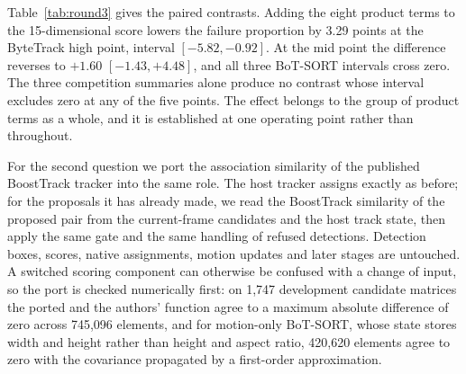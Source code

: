 Table~\ref{tab:round3} gives the paired contrasts. Adding the eight product
terms to the 15-dimensional score lowers the failure proportion by 3.29
points at the ByteTrack high point, interval $[-5.82,-0.92]$. At the mid
point the difference reverses to $+1.60$ $[-1.43,+4.48]$, and all three
BoT-SORT intervals cross zero. The three competition summaries alone
produce no contrast whose interval excludes zero at any of the five
points. The effect belongs to the group of product terms as a whole, and
it is established at one operating point rather than throughout.

For the second question we port the association similarity of the published
BoostTrack tracker \cite{stanjoevic2024boosttrack} into the same role. The
host tracker assigns exactly as
before; for the proposals it has already made, we read the BoostTrack
similarity of the proposed pair from the current-frame candidates and the
host track state, then apply the same gate and the same handling of
refused detections. Detection boxes, scores, native assignments, motion
updates and later stages are untouched. A switched scoring component can
otherwise be confused with a change of input, so the port is checked
numerically first: on 1,747 development candidate matrices the ported and
the authors' function agree to a maximum absolute difference of zero
across 745,096 elements, and for motion-only BoT-SORT, whose state stores
width and height rather than height and aspect ratio, 420,620 elements
agree to zero with the covariance propagated by a first-order
approximation.

